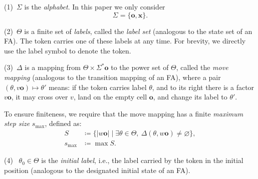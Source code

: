 \documentclass[11pt]{article}
\theoremstyle{definition}
\theoremstyle{plain}
\newcommand{\x}{\mathbf{x}}
\newcommand{\e}{\mathbf{o}}
\begin{document}
(1)~$\varSigma$ is the \textit{alphabet}. In this paper we only consider
\[
    \varSigma = \{\e, \x\}.
\]

(2)~$\varTheta$ is a finite set of \textit{labels}, called the \textit{label set} (analogous to the state set of an FA).
    The token carries one of these labels at any time.
    For brevity, we directly use the label symbol to denote the token.

(3)~$\varDelta$ is a mapping from $\varTheta \times \varSigma^* \e$ to the power set of $\varTheta$, called the \textit{move mapping} (analogous to the transition mapping of an FA),
where a pair $(\theta, v\e)\mapsto \theta'$ means:
if the token carries label $\theta$, and to its right there is a factor $v\e$, it may cross over $v$, land on the empty cell $\e$, and change its label to $\theta'$.

To ensure finiteness, we require that the move mapping has a finite \textit{maximum step size} $s_{\max}$, defined as:
\begin{align*}
    S        &\coloneq \{ |w\e| \mid \exists \theta \in \varTheta,\ \varDelta(\theta,w\e) \neq \varnothing \},\\
    s_{\max} &\coloneq \max S.
\end{align*}

(4)~ $\theta_0 \in\varTheta$ is the \textit{initial label}, i.e., the label carried by the token in the initial position (analogous to the designated initial state of an FA).
\end{document}
